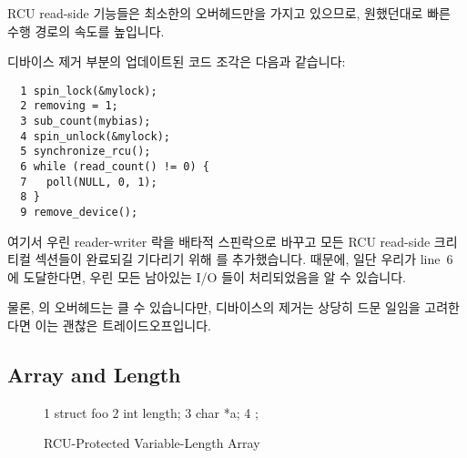 RCU read-side 기능들은 최소한의 오버헤드만을 가지고 있으므로, 원했던대로 빠른
수행 경로의 속도를 높입니다.

디바이스 제거 부분의 업데이트된 코드 조각은 다음과 같습니다:
\iffalse

The RCU read-side primitives have minimal overhead, thus speeding up
the fastpath, as desired.

The updated code fragment removing a device is as follows:
\fi

\vspace{5pt}
\begin{minipage}[t]{\columnwidth}
\small
\begin{verbatim}
  1 spin_lock(&mylock);
  2 removing = 1;
  3 sub_count(mybias);
  4 spin_unlock(&mylock);
  5 synchronize_rcu();
  6 while (read_count() != 0) {
  7   poll(NULL, 0, 1);
  8 }
  9 remove_device();
\end{verbatim}
\end{minipage}
\vspace{5pt}

여기서 우린 reader-writer 락을 배타적 스핀락으로 바꾸고 모든 RCU read-side
크리티컬 섹션들이 완료되길 기다리기 위해  를
추가했습니다.
 때문에, 일단 우리가 line~6 에 도달한다면, 우린 모든
남아있는 I/O 들이 처리되었음을 알 수 있습니다.

물론,  의 오버헤드는 클 수 있습니다만, 디바이스의 제거는
상당히 드문 일임을 고려한다면 이는 괜찮은 트레이드오프입니다.
\iffalse

Here we replace the reader-writer lock with an exclusive spinlock and
add a \co{synchronize_rcu()} to wait for all of the RCU read-side
critical sections to complete.
Because of the \co{synchronize_rcu()},
once we reach line~6, we know that all remaining I/Os have been accounted
for.

Of course, the overhead of \co{synchronize_rcu()} can be large,
but given that device removal is quite rare, this is usually a good
tradeoff.
\fi

\subsection{Array and Length}
\label{sec:together:Array and Length}

\begin{figure}[tbp]
{ \scriptsize
\begin{verbbox}
 1 struct foo {
 2   int length;
 3   char *a;
 4 };
\end{verbbox}
}
\centering
\theverbbox
\caption{RCU-Protected Variable-Length Array}
\label{fig:together:RCU-Protected Variable-Length Array}
\end{figure}

